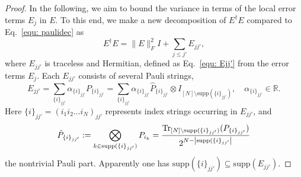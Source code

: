 \documentclass[showpacs,amsmath,amssymb,twocolumn,aps,pra,superscriptaddress,notitlepage,10pt]{revtex4-2}
\newcommand{\supp}{\mathrm{supp}}
\begin{document}
\begin{proof}
    In the following, we aim to bound the variance in terms of the local error terms $E_j$ in $E$. To this end, we make a new decomposition of $E^\dagger E$ compared to Eq.~\eqref{equ: paulidec} as
    \begin{equation}
        E^\dagger E=\|E\|_F^2I+\sum_{j\le j'}E_{jj'}\label{equ: reorg},
    \end{equation}
    where $E_{jj'}$ is traceless and Hermitian, defined as Eq.~\eqref{equ: Ejj'} from the error terms $E_j$.
    Each $E_{jj'}$ consists of several Pauli strings,
    \begin{equation}
        E_{jj'}=\sum_{\{i\}_{jj'}}\alpha_{\{i\}_{jj'}}P_{\{i\}_{jj'}}=\sum_{\{i\}_{jj'}}\alpha_{\{i\}_{jj'}}\hat P_{\{i\}_{jj'}}\otimes I_{[N]\setminus\supp(\{i\}_{jj'})},\quad\alpha_{\{i\}_{jj'}} \in\mathbb R. \label{equ: paulistring}
    \end{equation}
    Here $\{i\}_{jj'}=(i_1i_2\dots i_N)_{jj'}$ represents index strings occurring in $E_{jj'}$, and
    \begin{equation}
        \hat P_{\{i\}_{jj'}}:=\bigotimes_{k\in\supp(\{i\}_{jj'})}P_{i_k}=\frac{\Tr_{[N]\setminus\supp(\{i\}_{jj'})}(P_{\{i\}_{jj'}})}{2^{N-\left|\supp(\{i\}_{jj'}\right|}}
    \end{equation}
    the nontrivial Pauli part.
    Apparently one has $\supp(\{i\}_{jj'})\subseteq \supp(E_{jj'})$.


\end{proof}
\end{document}
